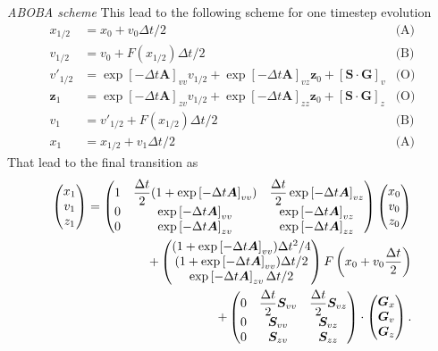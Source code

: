 \documentclass{article}
\numberwithin{equation}{section} %
\newcommand{\f}[2]{\mathchoice%
			{\dfrac{#1}{#2}}
	    	{\dfrac{#1}{#2}}
			{\frac{#1}{#2}}
			{\frac{#1}{#2}}}
\newcommand{\tf}[2]{\ensuremath{#1/#2}}
\newcommand{\1}{\mathds{1}} %
\begin{document}
\textit{ABOBA scheme} This lead to the following scheme for one timestep evolution
\begin{align}
    \label{eq:ABOBA_scheme}
    x_{\tf{1}{2}}& = x_0 + v_0 \tf{\Delta t}{2} & \textrm{(A)}\\
    v_{\tf{1}{2}}& = v_0 + F(x_{\tf{1}{2}}) \tf{\Delta t}{2} & \textrm{(B)}\\
    v'_{\tf{1}{2}}& = \exp\left[- \Delta t \bm{A} \right]_{vv}v_{\tf{1}{2}} +\exp\left[- \Delta t \bm{A} \right]_{vz} \bm{z}_{0} +  [\bm{S}  \cdot \bm{G}]_{v} & \textrm{(O)} \\
    \bm{z}_1& = \exp\left[- \Delta t \bm{A} \right]_{zv}v_{\tf{1}{2}} +\exp\left[- \Delta t \bm{A} \right]_{zz} \bm{z}_{0}   + [\bm{S}  \cdot \bm{G}]_{z} & \textrm{(O)} \\
    v_1&= v'_{\tf{1}{2}} + F(x_{\tf{1}{2}}) \tf{\Delta t}{2} & \textrm{(B)}\\
    x_1 &= x_{\tf{1}{2}}+ v_1 \tf{\Delta t}{2}& \textrm{(A)}
\end{align}
That lead to the final transition as
\begin{align}
    \label{eq:ABOBA_transition}
    \begin{pmatrix}
    x_1 \\ v_1 \\ z_1
    \end{pmatrix}=
    \begin{pmatrix}
    1 & \f{\Delta t}{2}(1+\exp\left[- \Delta t \bm{A} \right]_{vv}) & \f{\Delta t}{2}\exp\left[- \Delta t \bm{A} \right]_{vz} \\0 & \exp\left[- \Delta t \bm{A} \right]_{vv} & \exp\left[- \Delta t \bm{A} \right]_{vz} \\0 &\exp\left[- \Delta t \bm{A} \right]_{zv}  &\exp\left[- \Delta t \bm{A} \right]_{zz} 
    \end{pmatrix}
    \begin{pmatrix}
    x_0 \\ v_0 \\ z_0
    \end{pmatrix}\nonumber\\+ 
    \begin{pmatrix}
    (1+\exp\left[- \Delta t \bm{A} \right]_{vv})\tf{\Delta t ^2}{4} \\(1+\exp\left[- \Delta t \bm{A} \right]_{vv}) \tf{\Delta t}{2}\\
    \exp\left[- \Delta t \bm{A} \right]_{zv} \tf{\Delta t}{2}
    \end{pmatrix} F\left(x_0 + v_0 \f{\Delta t}{2}\right)\\
    +\begin{pmatrix}
    0 & \f{\Delta t}{2} \bm{S}_{vv} &  \f{\Delta t}{2} \bm{S}_{vz}\\
    0 & \bm{S}_{vv} & \bm{S}_{vz} \\
    0 & \bm{S}_{zv} & \bm{S}_{zz}
    \end{pmatrix} \cdot
    \begin{pmatrix}
    \bm{G}_x\\ \bm{G}_v\\  \bm{G}_z
    \end{pmatrix}.\nonumber
\end{align}
\end{document}
